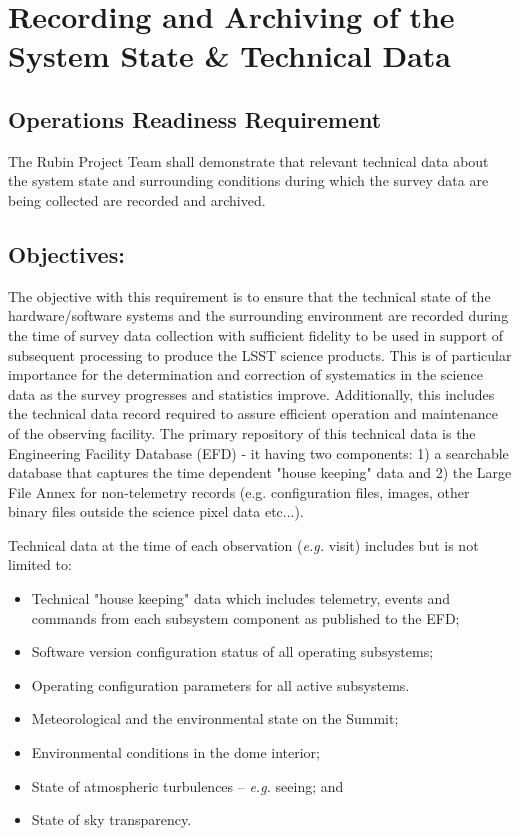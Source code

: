 \section{Recording and Archiving of the System State \& Technical Data}  \label{sec:metadata}

\subsection{Operations Readiness Requirement}

The Rubin Project Team shall demonstrate that relevant technical data about the system state and surrounding conditions during which the survey data are being collected are recorded and  archived.

\subsection{Objectives:}

The objective with this requirement is to ensure that the technical state of the hardware/software systems and the surrounding environment are recorded during the time of survey data collection with sufficient fidelity to be used in support of subsequent processing to produce the LSST science products. This is of particular importance for the determination and correction of systematics in the science data as the survey progresses and statistics improve.  Additionally, this includes the technical data record required to assure efficient operation and maintenance of the observing facility.   The primary repository of this technical data is the Engineering Facility Database (EFD) - it having two components: 1) a searchable database that captures the time dependent "house keeping" data and 2) the Large File Annex for non-telemetry records (e.g. configuration files, images, other binary files outside the science pixel data etc...).

Technical data at the time of each observation ({\it e.g.} visit) includes but is not limited to:

\begin{itemize}
	\item Technical "house keeping" data which includes telemetry, events and commands from each subsystem component as published to the EFD;
	\item Software version configuration status of all operating subsystems;
	\item Operating configuration parameters for all active subsystems.
	\item Meteorological and the environmental state on the Summit;
	\item Environmental conditions in the dome interior;
	\item State of atmospheric turbulences -- {\it e.g.} seeing; and
	\item State of sky transparency.
\end{itemize}

